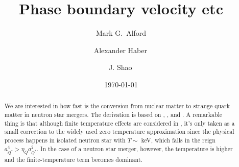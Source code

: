\documentclass[superscriptaddress,amsmath,floatfix,aps,prc,twocolumn]{revtex4-1}
\begin{document}
\title{Phase boundary velocity etc}
\author{Mark G.~Alford}

\author{Alexander Haber\,}

\author{J. Shao\,}

\date{\today}   %


\begin{abstract}
We are interested in how fast is the conversion from nuclear matter to strange quark matter in neutron star mergers. The derivation is based on \cite{Olinto:1986je}, \cite{Madsen:1993xx}, and \cite{Alford:2014jha}. A remarkable thing is that although finite temperature effects are considered in \cite{Alford:2014jha}, it's only taken as a small correction to the widely used zero temperature approximation since the physical process happens in isolated neutron star with $T\sim$ keV, which falls in the reign $a_{Q^*}^4>\eta_Q a_{Q^*}^2$. In the case of a neutron star merger, however, the temperature is higher and the finite-temperature term becomes dominant.
\end{abstract}

\maketitle
\end{document}
